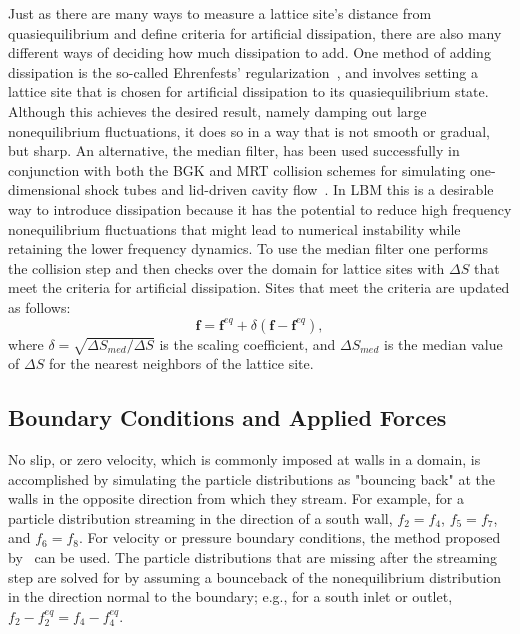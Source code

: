 Just as there are many ways to measure a lattice site's distance from quasiequilibrium and define criteria for artificial dissipation, there are also many different ways of deciding how much dissipation to add.
One method of adding dissipation is the so-called Ehrenfests' regularization~\cite{brownlee2006stabilization}, and involves setting a lattice site that is chosen for artificial dissipation to its quasiequilibrium state.
Although this achieves the desired result, namely damping out large nonequilibrium fluctuations, it does so in a way that is not smooth or gradual, but sharp.
An alternative, the median filter, has been used successfully in conjunction with both the BGK and MRT collision schemes for simulating one-dimensional shock tubes and lid-driven cavity flow~\cite{brownlee2008nonequilibrium,gorban2014enhancement,packwood2009entropy}.
In LBM this is a desirable way to introduce dissipation because it has the potential to reduce high frequency nonequilibrium fluctuations that might lead to numerical instability while retaining the lower frequency dynamics.
To use the median filter one performs the collision step and then checks over the domain for lattice sites with $\Delta S$ that meet the criteria for artificial dissipation.
Sites that meet the criteria are updated as follows:
\begin{equation} \label{eq:median-filter}
\mathbf{f} = \mathbf{f}^{eq} + \delta (\mathbf{f} - \mathbf{f}^{eq}),
\end{equation}
\noindent where $\delta = \sqrt{\Delta S_{med} / \Delta S}$ is the scaling coefficient, and $\Delta S_{med}$ is the median value of $\Delta S$ for the nearest neighbors of the lattice site.


\subsection{Boundary Conditions and Applied Forces} \label{sec:bcs}

No slip, or zero velocity, which is commonly imposed at walls in a domain, is accomplished by simulating the particle distributions as "bouncing back" at the walls in the opposite direction from which they stream.
For example, for a particle distribution streaming in the direction of a south wall, $f_2 = f_4$, $f_5 = f_7$, and $f_6 = f_8$.
For velocity or pressure boundary conditions, the method proposed by~\citet{zou1997pressure} can be used.
The particle distributions that are missing after the streaming step are solved for by assuming a bounceback of the nonequilibrium distribution in the direction normal to the boundary; e.g., for a south inlet or outlet, $f_2 - f_2^{eq} = f_4 - f_4^{eq}$.

